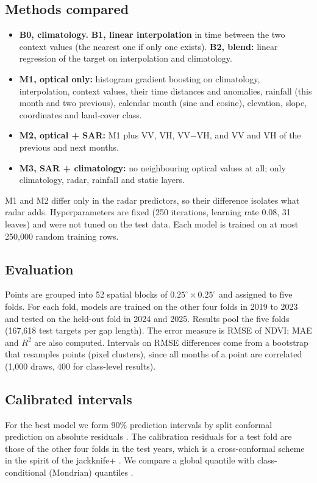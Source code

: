 \documentclass[conference]{IEEEtran}
\begin{document}
\subsection{Methods compared}
\begin{itemize}
\item \textbf{B0, climatology.} \textbf{B1, linear interpolation} in time between the two context values (the nearest one if only one exists). \textbf{B2, blend:} linear regression of the target on interpolation and climatology.
\item \textbf{M1, optical only:} histogram gradient boosting \cite{friedman2001gbm,pedregosa2011sklearn} on climatology, interpolation, context values, their time distances and anomalies, rainfall (this month and two previous), calendar month (sine and cosine), elevation, slope, coordinates and land-cover class.
\item \textbf{M2, optical + SAR:} M1 plus VV, VH, VV$-$VH, and VV and VH of the previous and next months.
\item \textbf{M3, SAR + climatology:} no neighbouring optical values at all; only climatology, radar, rainfall and static layers.
\end{itemize}
M1 and M2 differ only in the radar predictors, so their difference isolates what radar adds. Hyperparameters are fixed (250 iterations, learning rate 0.08, 31 leaves) and were not tuned on the test data. Each model is trained on at most 250{,}000 random training rows.

\subsection{Evaluation}
Points are grouped into 52 spatial blocks of $0.25^\circ\times0.25^\circ$ and assigned to five folds. For each fold, models are trained on the other four folds in 2019 to 2023 and tested on the held-out fold in 2024 and 2025. Results pool the five folds (167{,}618 test targets per gap length). The error measure is RMSE of NDVI; MAE and $R^2$ are also computed. Intervals on RMSE differences come from a bootstrap that resamples points (pixel clusters), since all months of a point are correlated (1{,}000 draws, 400 for class-level results).

\subsection{Calibrated intervals}
For the best model we form 90\% prediction intervals by split conformal prediction on absolute residuals \cite{lei2018distribution}. The calibration residuals for a test fold are those of the other four folds in the test years, which is a cross-conformal scheme in the spirit of the jackknife+ \cite{barber2021jackknifeplus}. We compare a global quantile with class-conditional (Mondrian) quantiles \cite{vovk2012conditional}.
\end{document}
